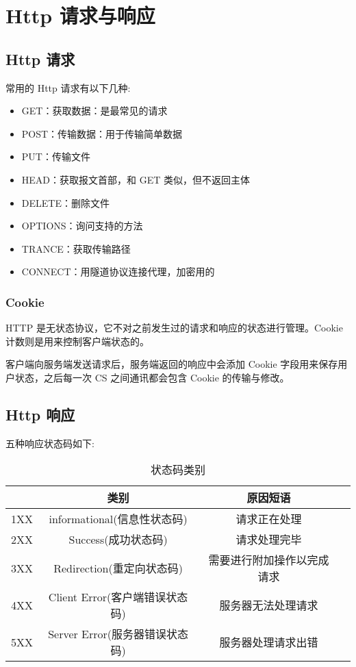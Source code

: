 \section{Http 请求与响应}
\subsection{Http 请求}

常用的 Http 请求有以下几种:
\begin{itemize}
    \item GET：获取数据：是最常见的请求
    \item POST：传输数据：用于传输简单数据
    \item PUT：传输文件
    \item HEAD：获取报文首部，和 GET 类似，但不返回主体
    \item DELETE：删除文件
    \item OPTIONS：询问支持的方法
    \item TRANCE：获取传输路径
    \item CONNECT：用隧道协议连接代理，加密用的
\end{itemize}

\subsubsection*{Cookie}

HTTP 是无状态协议，它不对之前发生过的请求和响应的状态进行管理。Cookie 计数则是用来控制客户端状态的。

客户端向服务端发送请求后，服务端返回的响应中会添加 Cookie 字段用来保存用户状态，之后每一次 CS 之间通讯都会包含 Cookie 的传输与修改。

\subsection{Http 响应}

五种响应状态码如下:

\begin{table}[H]
    \centering
    \caption{状态码类别}
    \label{table:状态码类别}
    \setlength{\tabcolsep}{4mm}
    \begin{tabular}{c|c|cc}
        \toprule
        \textbf{} & \textbf{类别} & \textbf{原因短语} \\
        \midrule
        1XX & informational(信息性状态码) & 请求正在处理 \\
        2XX & Success(成功状态码) & 请求处理完毕 \\
        3XX & Redirection(重定向状态码) & 需要进行附加操作以完成请求 \\
        4XX & Client Error(客户端错误状态码) & 服务器无法处理请求 \\
        5XX & Server Error(服务器错误状态码) & 服务器处理请求出错 \\
        \bottomrule
    \end{tabular}
\end{table}

